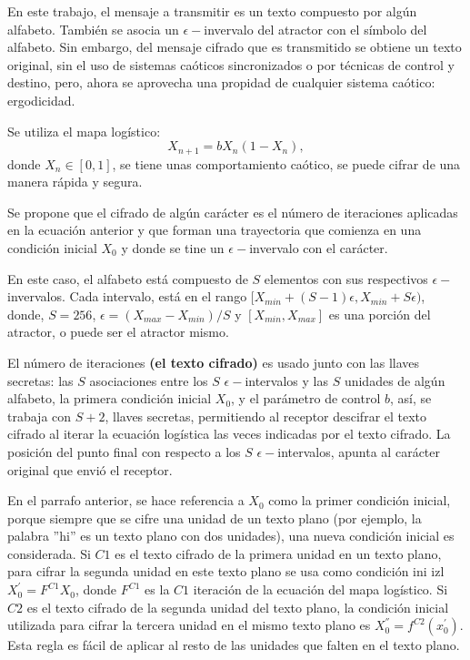\documentclass[10pt]{IEEEtran}
\begin{document}
En este trabajo, el mensaje a transmitir es un texto compuesto por algún alfabeto. También se asocia un $\epsilon-$invervalo del atractor con el símbolo del alfabeto. Sin embargo, del mensaje cifrado que es transmitido se obtiene un texto original,  sin el uso de sistemas caóticos sincronizados o por técnicas de control y destino, pero, ahora se aprovecha una propidad de cualquier sistema caótico: ergodicidad.

Se utiliza el mapa logístico:
\begin{equation}
X_{n+1}=bX_{n}(1- X_{n}),
\end{equation}
donde $X_{n} \in [0,1]$, se tiene unas comportamiento caótico, se puede cifrar de una manera rápida y segura.

Se propone que el cifrado de algún carácter es el número de iteraciones aplicadas en la ecuación anterior y que forman una trayectoria que comienza en una condición inicial $X_{0}$ y donde se tine un $\epsilon-$invervalo con el carácter.

En este caso, el alfabeto está compuesto de $S$ elementos con sus respectivos $\epsilon-$invervalos. Cada intervalo, está en el rango $[X_{min} + (S-1)\epsilon, X_{min}+ S \epsilon )$, donde, $S=256$, $\epsilon = (X_{max}- X_{min})/S$ y $[X_{min}, X_{max}]$ es una porción del atractor, o puede ser el atractor mismo.

El número de iteraciones \textbf{(el texto cifrado)} es usado junto con las llaves secretas: las $S$ asociaciones entre los $S$ $\epsilon-$intervalos y las $S$ unidades de algún alfabeto, la primera condición inicial $X_{0}$, y el parámetro de control $b$, así, se trabaja con $S+2$, llaves secretas, permitiendo al receptor descifrar el texto cifrado al iterar la ecuación logística las veces indicadas por el texto cifrado. La posición del punto final con respecto a los $S$ $\epsilon-$intervalos, apunta al carácter original que envió el receptor. 


En el parrafo anterior, se hace referencia a $X_{0}$ como la primer condición inicial, porque siempre que se cifre una unidad de un texto plano (por ejemplo, la palabra ''hi'' es un texto plano con dos unidades), una nueva condición inicial es considerada. Si $C1$ es el texto cifrado de la primera unidad en un texto plano, para cifrar la segunda unidad en este texto plano se usa como condición ini izl $X^{'}_{0}= F^{C1}X_{0}$, donde $F^{C1}$ es la $C1$ iteración de la ecuación del mapa logístico. Si $C2$ es el texto cifrado de la segunda unidad del texto plano, la condición inicial utilizada para cifrar la tercera unidad en el mismo texto plano es $X_{0}^{''}= f^{C2}(x_{0}^{'})$. Esta regla es fácil de aplicar al resto de las unidades que falten en el texto plano.
\end{document}
